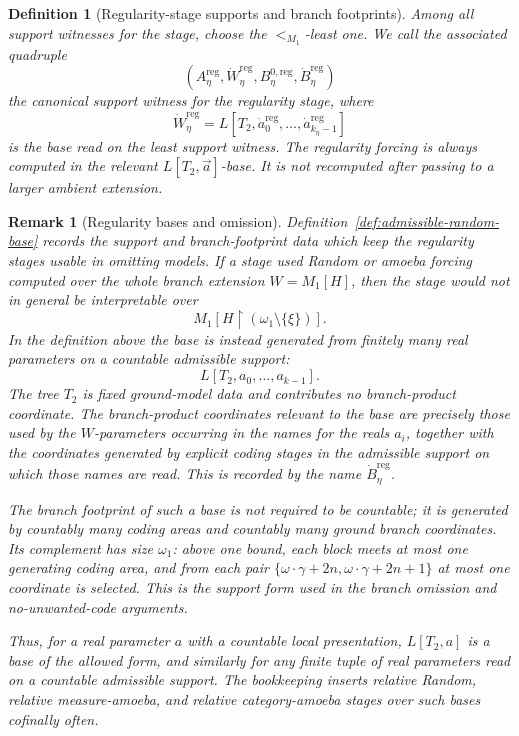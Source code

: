 \documentclass[a4paper,11pt]{article}
\newtheorem{definition}[theorem]{Definition}
\newtheorem{remark}[theorem]{Remark}
\begin{document}
\begin{definition}[Regularity-stage supports and branch footprints]
Among all support witnesses for the stage, choose the \(<_{M_1}\)-least one.  We
call the associated quadruple
\[
   (A^{\mathrm{reg}}_\eta,
    \dot W^{\mathrm{reg}}_\eta,
    B^{0,\mathrm{reg}}_\eta,
    \dot B^{\mathrm{reg}}_\eta)
\]
the \emph{canonical support witness} for the regularity stage, where
\[
   \dot W^{\mathrm{reg}}_\eta
   =L[T_2,
      \dot a^{\mathrm{reg}}_0,\ldots,
      \dot a^{\mathrm{reg}}_{k_\eta-1}]
\]
is the base read on the least support witness.  The regularity forcing is always
computed in the relevant \(L[T_2,\vec a]\)-base.  It is not recomputed after
passing to a larger ambient extension.
\end{definition}

\begin{remark}[Regularity bases and omission]
Definition~\ref{def:admissible-random-base} records the support and branch-footprint data which keep the regularity stages usable
in omitting models.  If a stage used Random or amoeba forcing computed over the
whole branch extension \(W=M_1[H]\), then the stage would not in general be
interpretable over
\[
   M_1[H\upharpoonright(\omega_1\setminus\{\xi\})].
\]
In the definition above the base is instead generated from finitely many real
parameters on a countable admissible support:
\[
   L[T_2,a_0,\ldots,a_{k-1}].
\]
The tree \(T_2\) is fixed ground-model data and contributes no branch-product
coordinate.  The branch-product coordinates relevant to the base are precisely
those used by the \(W\)-parameters occurring in the names for the reals
\(a_i\), together with the coordinates generated by explicit coding stages in
the admissible support on which those names are read.  This is recorded by the
name \(\dot B^{\mathrm{reg}}_\eta\).

The branch footprint of such a base is not required to be countable; it is
generated by countably many coding areas and countably many ground branch
coordinates.  Its complement has size \(\omega_1\): above one bound, each block
meets at most one generating coding area, and from each pair
\(\{\omega\cdot\gamma+2n,\omega\cdot\gamma+2n+1\}\) at most one coordinate is
selected.  This is the support form used in the branch omission and
no-unwanted-code arguments.

Thus, for a real parameter \(a\) with a countable local presentation,
\(L[T_2,a]\) is a base of the allowed form, and similarly for any finite tuple
of real parameters read on a countable admissible support.  The bookkeeping
inserts relative Random, relative measure-amoeba, and relative category-amoeba
stages over such bases cofinally often.
\end{remark}
\end{document}
